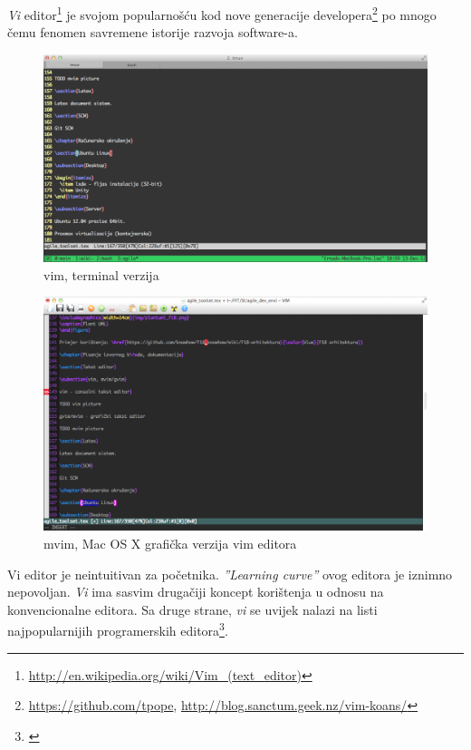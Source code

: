 \documentclass[times, utf8, seminar]{fit}
\begin{document}
\emph{Vi} editor\footnote{\url{http://en.wikipedia.org/wiki/Vim_(text_editor)}} je svojom popularnošću kod nove generacije developera\footnote{\url{https://github.com/tpope}, \url{http://blog.sanctum.geek.nz/vim-koans/}} po mnogo čemu fenomen savremene istorije razvoja software-a.

\begin{figure}[H]
\centering
\includegraphics[width=14cm]{img/vim.png}
\caption{vim, terminal verzija}
\end{figure}

\begin{figure}[H]
\centering
\includegraphics[width=14cm]{img/mvim.png}
\caption{mvim, Mac OS X grafička verzija vim editora}
\end{figure}

Vi editor je neintuitivan za početnika. \emph{''Learning curve''} ovog editora je iznimno nepovoljan. \emph{Vi} ima sasvim drugačiji koncept korištenja u odnosu na konvencionalne editora. Sa druge strane, \emph{vi} se uvijek nalazi na listi najpopularnijih programerskih editora\footnote{\href{http://tutorialzine.com/2012/07/battle-of-the-tools-which-is-the-best-code-editor}{\color{blue}{Pregled programerskih editora}}}.
\end{document}
